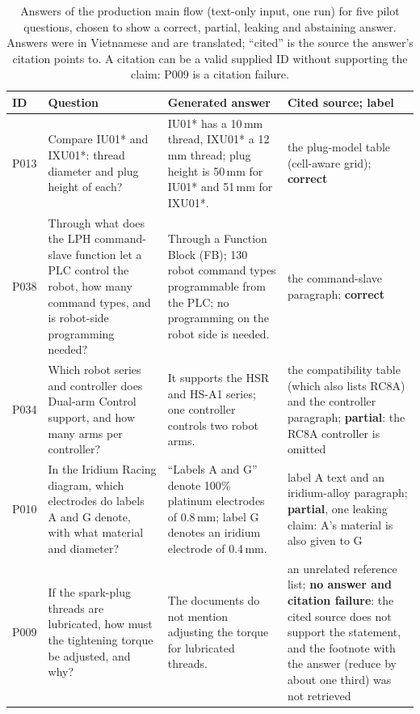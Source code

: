 \documentclass[runningheads]{llncs}
\begin{document}
\begin{table}[!htbp]
\centering\scriptsize
\caption{Answers of the production main flow (text-only input, one run) for five pilot questions, chosen to show a correct, partial, leaking and abstaining answer. Answers were in Vietnamese and are translated; ``cited'' is the source the answer's citation points to. A citation can be a valid supplied ID without supporting the claim: P009 is a citation failure.}
\label{tab:answers}
\setlength{\tabcolsep}{3pt}
\begin{tabular}{@{}lp{}p{}p{}@{}}
\toprule
ID & Question & Generated answer & Cited source; label \\
\midrule
P013 & Compare IU01* and IXU01*: thread diameter and plug height of each? & IU01* has a 10\,mm thread, IXU01* a 12\,mm thread; plug height is 50\,mm for IU01* and 51\,mm for IXU01*. & the plug-model table (cell-aware grid); \textbf{correct} \\
P038 & Through what does the LPH command-slave function let a PLC control the robot, how many command types, and is robot-side programming needed? & Through a Function Block (FB); 130 robot command types programmable from the PLC; no programming on the robot side is needed. & the command-slave paragraph; \textbf{correct} \\
P034 & Which robot series and controller does Dual-arm Control support, and how many arms per controller? & It supports the HSR and HS-A1 series; one controller controls two robot arms. & the compatibility table (which also lists RC8A) and the controller paragraph; \textbf{partial}: the RC8A controller is omitted \\
P010 & In the Iridium Racing diagram, which electrodes do labels A and G denote, with what material and diameter? & ``Labels A and G'' denote 100\% platinum electrodes of 0.8\,mm; label G denotes an iridium electrode of 0.4\,mm. & label A text and an iridium-alloy paragraph; \textbf{partial}, one leaking claim: A's material is also given to G \\
P009 & If the spark-plug threads are lubricated, how must the tightening torque be adjusted, and why? & The documents do not mention adjusting the torque for lubricated threads. & an unrelated reference list; \textbf{no answer and citation failure}: the cited source does not support the statement, and the footnote with the answer (reduce by about one third) was not retrieved \\
\bottomrule
\end{tabular}
\end{table}
\end{document}
